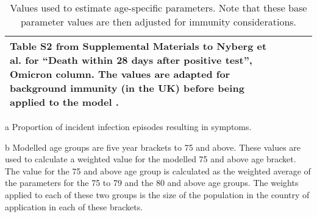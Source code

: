 \begin{table}
\begin{threeparttable}
\begin{tabularx}{\textwidth}{| X | X | X | X | X |}
        Table S2 from Supplemental Materials to Nyberg et al. 
        for ``Death within 28 days after positive test'', Omicron column.
        The values are adapted for background immunity (in the UK) before being applied to the
        model \cite{nyberg-2022}. \\
        \hline
	\end{tabularx}
	\caption{Values used to estimate age-specific parameters.
    Note that these base parameter values are then adjusted for immunity considerations.}
	\label{tab:age_params}
    \begin{tablenotes}
        \item[a] Proportion of incident infection episodes resulting in symptoms.
        \item[b] Modelled age groups are five year brackets to 75 and above.
        These values are used to calculate a weighted value 
        for the modelled 75 and above age bracket.
        The value for the 75 and above age group 
        is calculated as the weighted average 
        of the parameters for the 75 to 79 and the 80 and above age groups.
        The weights applied to each of these two groups 
        is the size of the population in the country of application in each of these brackets.
    \end{tablenotes}
    \end{threeparttable}
\end{table}
